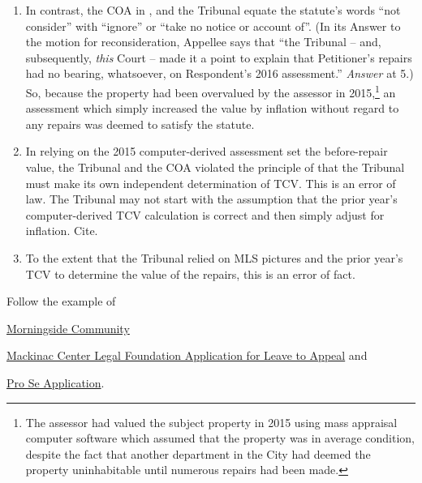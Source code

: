 \documentclass[12pt,\documentclassflag]{michiganCourtOfAppealsBrief}
\begin{document}
\begin{todolist}
\begin{enumerate}
    \item In contrast, the COA in \cite{Patru 2}, and the Tribunal equate the statute's words ``not consider'' with ``ignore'' or ``take no notice or account of''. (In its Answer to the motion for reconsideration, Appellee says that ``the Tribunal -- and, subsequently, \emph{this} Court -- made it a point to explain that Petitioner's repairs had no bearing, whatsoever, on Respondent's 2016 assessment.'' \emph{Answer} at 5.)  So, because the property had been overvalued by the assessor in 2015,\footnote{The assessor had valued the subject property in 2015 using mass appraisal computer software which assumed that the property was in average condition, despite the fact that another department in the City had deemed the property uninhabitable until numerous repairs had been made.} an assessment which simply increased the value by inflation without regard to any repairs was deemed to satisfy the statute. 

    \item In relying on the 2015 computer-derived assessment set the before-repair value, the Tribunal and the COA violated the principle of \cite{Jones & Laughlin} that the Tribunal must make its own independent determination of TCV. This is an error of law. The Tribunal may not start with the assumption that the prior year's computer-derived TCV calculation is correct and then simply adjust for inflation. Cite.
      
    \item To the extent that the Tribunal relied on MLS pictures and the prior year's TCV to determine the value of the repairs, this is an error of fact. 

    \end{enumerate}
  \item Follow the example of
  \begin{todolist}
  \item \href{https://www.naacpldf.org/files/about-us/2017-11-1%20MorningSide%20v.%20Sabree%20Leave%20Application%20-%20Final.pdf}{Morningside Community}
      \item \href{https://www.mackinac.org/archives/2010/ApplicationforLeavetoAppealtoMSC.pdf}{Mackinac Center Legal Foundation Application for Leave to Appeal} and
      \item  \href{https://courts.michigan.gov/Courts/MichiganSupremeCourt/Clerks/ClerksOfficeDocuments/Pro-Per_MI-Sup-Ct_Civil-Application_05-2017_FillableForm.pdf}{Pro Se Application}.
      \end{todolist}


\end{todolist}
\end{document}
